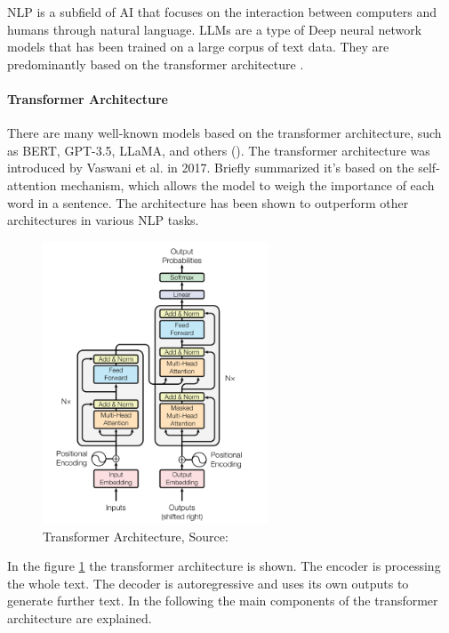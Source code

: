 

NLP is a subfield of AI that focuses on the interaction between computers and humans through natural language. LLMs are a type of Deep neural network models that has been trained on a large corpus of text data. They are predominantly based on the transformer architecture \cite{Wolf.09.10.2019}. 

\paragraph{Transformer Architecture}
There are many well-known models based on the transformer architecture, such as BERT, GPT-3.5, LLaMA, and others (\cite{Yin.2024}). The transformer architecture was introduced by Vaswani et al. in 2017. Briefly summarized it's based on the self-attention mechanism, which allows the model to weigh the importance of each word in a sentence. The architecture has been shown to outperform other architectures in various NLP tasks.

\begin{figure}[h!]
    \centering
    \includegraphics[width=0.6\textwidth]{images/transformers_architecture.png}
    \caption{Transformer Architecture, Source: \cite{vaswani2023attentionneed}}
    \label{fig:transformer_architecture}
\end{figure}

In the figure \ref{fig:transformer_architecture} the transformer architecture is shown. The encoder is processing the whole text. The decoder is autoregressive and uses its own outputs to generate further text. In the following the main components of the transformer architecture are explained.

